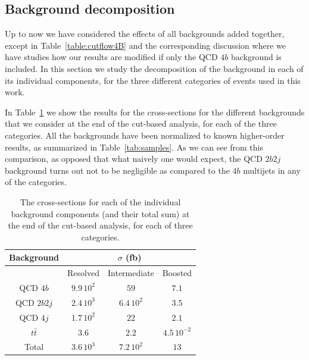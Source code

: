 \subsection{Background decomposition}

Up to now we have considered the effects of all backgrounds added
together, except in Table~\ref{table:cutflow4B} and the corresponding
discussion where we have studies how our
results are modified if only the QCD $4b$ background is included.
%
In this section we study the decomposition of the background in each
of its individual components, for the three different categories
of events used in this work.
%

In Table~\ref{table:cutflowBack}   we show the results for the cross-sections for the different
backgrounds that we consider at the end of the cut-based analysis, for each
of the three categories.
%
All the backgrounds have been normalized to known higher-order results,
as summarized in Table~\ref{tab:samples}.
%
As we can see from this comparison, as opposed that what naively one would expect,
the QCD $2b2j$ background turns out not to be negligible as compared to the $4b$
multijets in any of the categories.

\begin{table}[t]
  \centering
  \begin{tabular}{c|c|c|c}
    \hline
    Background  &    \multicolumn{3}{c}{$\sigma$ (fb)}   \\
    \hline
  &    Resolved  &  Intermediate  &   Boosted \\
    \hline
    \hline
  QCD $4b$   &   $9.9\,10^{2}$       &  $59$       &   $7.1$        \\
  QCD $2b2j$ &   $2.4\,10^{3}$       &  $6.4\,10^{2}$       &   $3.5$        \\
  QCD $4j$ &     $1.7\,10^{2}$       &   $22$      &    $2.1$        \\
  $t\bar{t}$ &   $3.6$       &  $2.2$       &   $4.5\,10^{-2}$        \\
  \hline
  \hline
Total     &    $3.6\,10^{3}$      &   $7.2\,10^{2}$      &     $13$      \\
\hline
\end{tabular}
    \caption{\small The cross-sections for each of the individual background
      components (and their total sum) at the end of the cut-based
      analysis, for each of three categories.
    \label{table:cutflowBack}
    }
\end{table}

